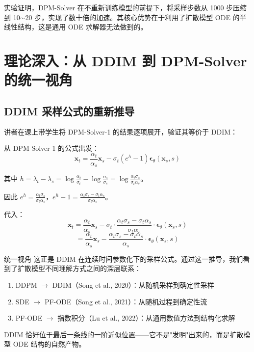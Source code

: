 \documentclass[a4paper]{article}
\begin{document}
实验证明，DPM-Solver 在不重新训练模型的前提下，将采样步数从 1000 步压缩到 10$\sim$20 步，实现了数十倍的加速。其核心优势在于利用了扩散模型 ODE 的半线性结构，这是通用 ODE 求解器无法做到的。


\section{理论深入：从 DDIM 到 DPM-Solver 的统一视角}

\subsection{DDIM 采样公式的重新推导}

讲者在课上带学生将 DPM-Solver-1 的结果逐项展开，验证其等价于 DDIM：

从 DPM-Solver-1 的公式出发：
$$\mathbf{x}_t = \frac{\alpha_t}{\alpha_s} \mathbf{x}_s - \sigma_t (e^{h} - 1) \boldsymbol{\epsilon}_\theta(\mathbf{x}_s, s)$$

其中 $h = \lambda_t - \lambda_s = \log\frac{\alpha_t}{\sigma_t} - \log\frac{\alpha_s}{\sigma_s} = \log\frac{\alpha_t \sigma_s}{\sigma_t \alpha_s}$。

因此 $e^h = \frac{\alpha_t \sigma_s}{\sigma_t \alpha_s}$，$e^h - 1 = \frac{\alpha_t \sigma_s - \sigma_t \alpha_s}{\sigma_t \alpha_s}$。

代入：
$$\mathbf{x}_t = \frac{\alpha_t}{\alpha_s} \mathbf{x}_s - \sigma_t \cdot \frac{\alpha_t \sigma_s - \sigma_t \alpha_s}{\sigma_t \alpha_s} \cdot \boldsymbol{\epsilon}_\theta(\mathbf{x}_s, s)$$
$$= \frac{\alpha_t}{\alpha_s} \mathbf{x}_s - \frac{\alpha_t \sigma_s - \sigma_t \alpha_s}{\alpha_s} \cdot \boldsymbol{\epsilon}_\theta(\mathbf{x}_s, s)$$

\begin{importantbox}{统一视角}
这正是 DDIM 在连续时间参数化下的采样公式。通过这一推导，我们看到了扩散模型不同理解方式之间的深层联系：
\begin{enumerate}
    \item DDPM $\to$ DDIM（Song et al., 2020）：从随机采样到确定性采样
    \item SDE $\to$ PF-ODE（Song et al., 2021）：从随机过程到确定性流
    \item PF-ODE $\to$ 指数积分（Lu et al., 2022）：从通用数值方法到结构化求解
\end{enumerate}
DDIM 恰好位于最后一条线的一阶近似位置——它不是"发明"出来的，而是扩散模型 ODE 结构的自然产物。
\end{importantbox}
\end{document}
